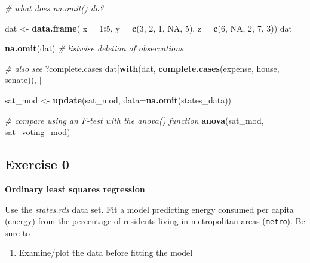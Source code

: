 \documentclass[]{book}
\newenvironment{Shaded}{\begin{snugshade}}{\end{snugshade}}
\newcommand{\CommentTok}[1]{\textcolor[rgb]{0.56,0.35,0.01}{\textit{#1}}}
\newcommand{\DataTypeTok}[1]{\textcolor[rgb]{0.13,0.29,0.53}{#1}}
\newcommand{\DecValTok}[1]{\textcolor[rgb]{0.00,0.00,0.81}{#1}}
\newcommand{\KeywordTok}[1]{\textcolor[rgb]{0.13,0.29,0.53}{\textbf{#1}}}
\newcommand{\NormalTok}[1]{#1}
\newcommand{\OperatorTok}[1]{\textcolor[rgb]{0.81,0.36,0.00}{\textbf{#1}}}
\newcommand{\OtherTok}[1]{\textcolor[rgb]{0.56,0.35,0.01}{#1}}
\newcommand{\StringTok}[1]{\textcolor[rgb]{0.31,0.60,0.02}{#1}}
\providecommand{\tightlist}{%
  \setlength{\itemsep}{0pt}\setlength{\parskip}{0pt}}
\begin{document}
\begin{Shaded}
\begin{Highlighting}[]
\CommentTok{# what does na.omit() do?}

\NormalTok{dat <-}\StringTok{ }\KeywordTok{data.frame}\NormalTok{(}
  \DataTypeTok{x =} \DecValTok{1}\OperatorTok{:}\DecValTok{5}\NormalTok{, }
  \DataTypeTok{y =} \KeywordTok{c}\NormalTok{(}\DecValTok{3}\NormalTok{, }\DecValTok{2}\NormalTok{, }\DecValTok{1}\NormalTok{, }\OtherTok{NA}\NormalTok{, }\DecValTok{5}\NormalTok{), }
  \DataTypeTok{z =} \KeywordTok{c}\NormalTok{(}\DecValTok{6}\NormalTok{, }\OtherTok{NA}\NormalTok{, }\DecValTok{2}\NormalTok{, }\DecValTok{7}\NormalTok{, }\DecValTok{3}\NormalTok{))}
\NormalTok{dat}

\KeywordTok{na.omit}\NormalTok{(dat) }\CommentTok{# listwise deletion of observations}

\CommentTok{# also see}
\NormalTok{?complete.cases}
\NormalTok{dat[}\KeywordTok{with}\NormalTok{(dat, }\KeywordTok{complete.cases}\NormalTok{(expense, house, senate)), ]}
\end{Highlighting}
\end{Shaded}

\begin{Shaded}
\begin{Highlighting}[]
\NormalTok{  sat_mod <-}\StringTok{ }\KeywordTok{update}\NormalTok{(sat_mod, }\DataTypeTok{data=}\KeywordTok{na.omit}\NormalTok{(states_data))}

  \CommentTok{# compare using an F-test with the anova() function}
  \KeywordTok{anova}\NormalTok{(sat_mod, sat_voting_mod)}
\end{Highlighting}
\end{Shaded}

\hypertarget{exercise-0-1}{%
\subsection{Exercise 0}\label{exercise-0-1}}

\textbf{Ordinary least squares regression}

Use the \emph{states.rds} data set. Fit a model predicting energy consumed per capita (energy) from the percentage of residents living in metropolitan areas (\texttt{metro}). Be sure to

\begin{enumerate}
\def\labelenumi{\arabic{enumi}.}
\tightlist
\item
  Examine/plot the data before fitting the model
\end{enumerate}
\end{document}
